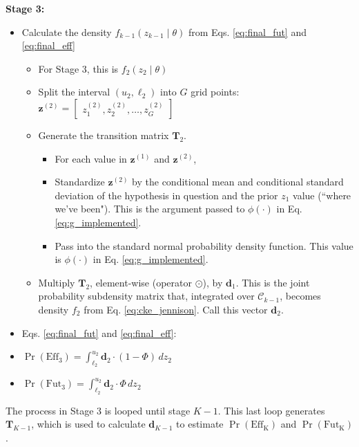 \documentclass{article}
\begin{document}
\textbf{Stage 3:}
\begin{itemize}[label={--}]
    \item Calculate the density $f_{k-1}(z_{k-1}\mid\theta)$ from Eqs. \eqref{eq:final_fut} and \eqref{eq:final_eff}
    \begin{itemize}[label={\raisebox{0.25ex}{\scalebox{0.75}{\textbullet}}}]
            \item For Stage 3, this is $f_{2}(z_{2}\mid\theta)$
            \item Split the interval $(u_2,\ell_2)$ into $G$ grid points: $\mathbf{z}^{(2)}=\begin{bmatrix}
                z_1^{(2)},z_2^{(2)},\dots,z_G^{(2)}
            \end{bmatrix}$
            \item Generate the transition matrix $\mathbf{T}_2$. 
            \begin{itemize}[label={$\circ$}]
                \item For each value in $\mathbf{z}^{(1)}$ and $\mathbf{z}^{(2)}$,
                \item Standardize $\mathbf{z}^{(2)}$ by the conditional mean and conditional standard deviation of the hypothesis in question and the prior $z_1$ value (``where we've been"). This is the argument passed to $\phi(\cdot)$ in Eq. \eqref{eq:g_implemented}.
                \item Pass into the standard normal probability density function. This value is $\phi(\cdot)$ in Eq. \eqref{eq:g_implemented}.
            \end{itemize}
            \item Multiply $\mathbf{T}_2$, element-wise (operator $\odot$), by $\mathbf{d}_1$. This is the joint probability subdensity matrix that, integrated over $\mathcal{C}_{k-1}$, becomes density $f_2$ from Eq. \eqref{eq:cke_jennison}. Call this vector $\mathbf{d}_2$.
       \end{itemize}
    \item[] Eqs. \eqref{eq:final_fut} and \eqref{eq:final_eff}:
    \item $\Pr(\mathrm{Eff_3})=\int_{\ell_{2}}^{u_{2}} \mathbf{d}_2 \cdot(1-\Phi)\,dz_2$
    \item $\Pr(\mathrm{Fut_3})=\int_{\ell_{2}}^{u_{2}} \mathbf{d}_2 \cdot \Phi\,dz_2$
\end{itemize}

The process in Stage 3 is looped until stage $K-1$. This last loop generates $\mathbf{T}_{K-1}$, which is used to calculate $\mathbf{d}_{K-1}$ to estimate $\Pr(\mathrm{Eff_K})$ and $\Pr(\mathrm{Fut_K})$.
%
\end{document}
